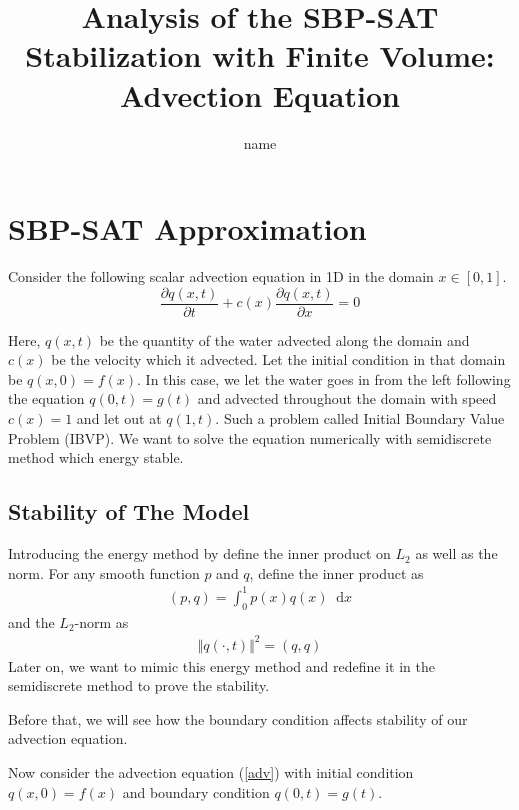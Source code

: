 \documentclass{article}
\title{Analysis of the SBP-SAT Stabilization with Finite Volume: Advection Equation}
\author{name}
\theoremstyle{definition}
\begin{document}
\maketitle

\section{SBP-SAT Approximation}
    Consider the following scalar advection equation in 1D in the domain $x \in [0,1]$. 
    \begin{equation}\label{adv}
        \frac{\partial q(x,t)}{\partial t} + c(x)\frac{\partial q(x,t)}{\partial x} = 0 
    \end{equation}

    Here, $q(x,t)$ be the quantity of the water advected along the domain 
    and $c(x)$ be the velocity which it advected. 
    Let the initial condition in that domain be $q(x,0)=f(x)$. 
    In this case, we let the water goes in from the left following the equation 
    $q(0,t)=g(t)$ and advected throughout the domain with 
    speed $c(x)=1$ and let out at $q(1,t)$. 
    Such a problem called Initial Boundary Value Problem (IBVP).
    We want to solve the equation numerically with semidiscrete 
    method which energy stable. 
    

\subsection{Stability of The Model}
    Introducing the energy method by define the inner product on $L_2$ as well as the norm.
    For any smooth function $p$ and $q$, define the inner product as 
    \begin{align} (p,q) = \int_0^1 p(x)q(x)\ \text{ d}x \end{align}
    and the $L_2$-norm as 
    \begin{align} \Vert q(\cdot,t) \Vert ^2 = (q,q) \end{align}
    Later on, we want to mimic this energy method and redefine it in the semidiscrete
    method to prove the stability. 

    Before that, we will see how the boundary condition affects stability of our advection 
    equation. 
    
    Now consider the advection equation (\ref{adv}) with initial condition 
    $q(x,0)=f(x)$ and boundary condition $q(0,t)=g(t)$. 
\end{document}
